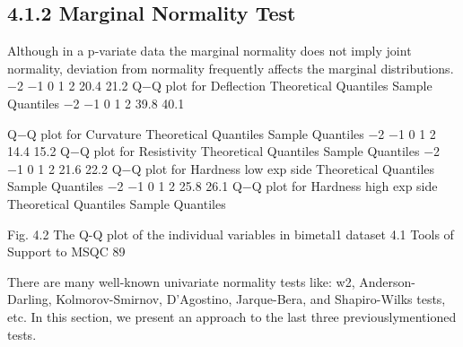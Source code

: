 \documentclass[]{beamer}
\begin{document}
\subsection{4.1.2 Marginal Normality Test}
\begin{frame}
Although in a p-variate data the marginal normality does not imply joint normality,
deviation from normality frequently affects the marginal distributions.
−2 −1 0 1 2
20.4 21.2
Q−Q plot for Deflection
Theoretical Quantiles
Sample Quantiles
−2 −1 0 1 2
39.8 40.1
\end{frame}
\begin{frame}[fragile]
Q−Q plot for Curvature
Theoretical Quantiles
Sample Quantiles
−2 −1 0 1 2
14.4 15.2
Q−Q plot for Resistivity
Theoretical Quantiles
Sample Quantiles
−2 −1 0 1 2
21.6 22.2
Q−Q plot for Hardness low exp side
Theoretical Quantiles
Sample Quantiles
−2 −1 0 1 2
25.8 26.1
Q−Q plot for Hardness high exp side
Theoretical Quantiles
Sample Quantiles
\end{frame}
\begin{frame}[fragile]
Fig. 4.2 The Q-Q plot of the individual variables in bimetal1 dataset
4.1 Tools of Support to MSQC 89


There are many well-known univariate normality tests like: w2, Anderson-Darling,
Kolmorov-Smirnov, D’Agostino, Jarque-Bera, and Shapiro-Wilks tests, etc.
In this section, we present an approach to the last three previouslymentioned tests.
\end{frame}
\end{document}
